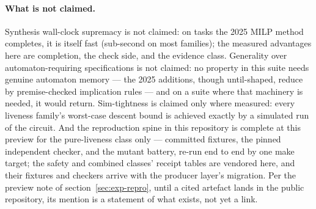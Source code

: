 \paragraph{What is not claimed.} Synthesis wall-clock supremacy is not
claimed: on tasks the 2025 MILP method completes, it is itself fast
(sub-second on most families); the measured advantages here are
completion, the check side, and the evidence class. Generality over
automaton-requiring specifications is not claimed: no property in this
suite needs genuine automaton memory --- the 2025 additions, though
until-shaped, reduce by premise-checked implication rules --- and on a
suite where that machinery is needed, it would return. Sim-tightness
is claimed only where measured: every liveness family's worst-case
descent bound is achieved exactly by a simulated run of the circuit.
And the reproduction spine in this repository is complete at this
preview for the pure-liveness class only --- committed fixtures, the
pinned independent checker, and the mutant battery, re-run end to end
by one make target; the safety and combined classes' receipt tables
are vendored here, and their fixtures and checkers arrive with the
producer layer's migration. Per the preview note of
section~\ref{sec:exp-repro}, until a cited artefact lands in the
public repository, its mention is a statement of what exists, not yet
a link.
